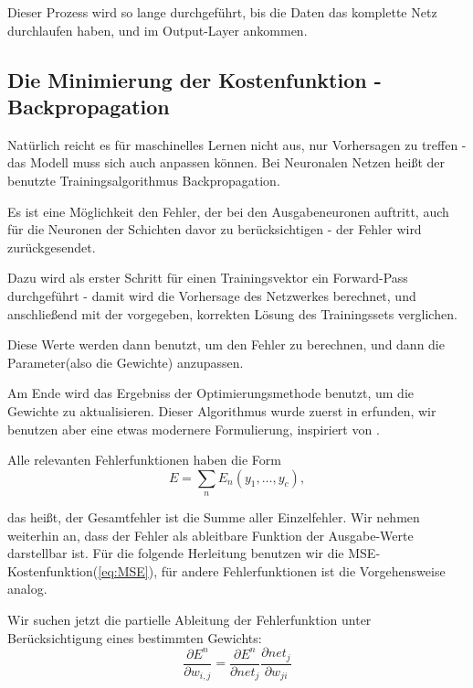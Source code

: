 Dieser Prozess wird so lange durchgeführt, bis die Daten das komplette Netz durchlaufen haben, und im Output-Layer ankommen\cite{bishop1995neural}.


\subsection{Die Minimierung der Kostenfunktion - Backpropagation}

Natürlich reicht es für maschinelles Lernen nicht aus, nur Vorhersagen zu treffen - das Modell muss sich auch anpassen können. Bei Neuronalen Netzen heißt der benutzte Trainingsalgorithmus Backpropagation.

Es ist eine Möglichkeit den Fehler, der bei den Ausgabeneuronen auftritt, auch für die Neuronen der Schichten davor zu berücksichtigen - der Fehler wird zurückgesendet.

Dazu wird als erster Schritt für einen Trainingsvektor ein Forward-Pass durchgeführt - damit wird die Vorhersage des Netzwerkes berechnet, und anschließend mit der vorgegeben, korrekten Lösung des Trainingssets verglichen.

Diese Werte werden dann benutzt, um den Fehler zu berechnen, und dann die Parameter(also die Gewichte) anzupassen.

Am Ende wird das Ergebniss der Optimierungsmethode benutzt, um die Gewichte zu aktualisieren. Dieser Algorithmus wurde zuerst in \cite{rumelhart1988learning} erfunden, wir benutzen aber eine etwas modernere Formulierung, inspiriert von \cite{bishop1995neural, duda2012pattern}. 

Alle relevanten Fehlerfunktionen haben die Form 
\begin{equation}
E = \sum_n E_n(y_1, \ldots, y_c),
\end{equation}

das heißt, der Gesamtfehler ist die Summe aller Einzelfehler.
Wir nehmen weiterhin an, dass der Fehler als ableitbare Funktion der Ausgabe-Werte darstellbar ist.
Für die folgende Herleitung benutzen wir die MSE-Kostenfunktion(\ref{eq:MSE}), für andere Fehlerfunktionen ist die Vorgehensweise analog.

Wir suchen jetzt die partielle Ableitung der Fehlerfunktion unter Berücksichtigung eines bestimmten Gewichts:
\begin{equation}
\frac{\partial E^n}{\partial w_{i,j}} = \frac{\partial E^n}{\partial net_j}  \frac{\partial net_j }{\partial w_{ji}}
\end{equation}

